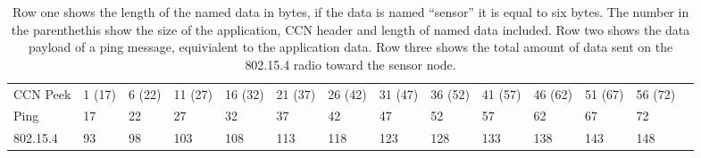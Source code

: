 





\begin{table}[]
\centering
\resizebox{\textwidth}{!}
{%
\begin{tabular}{|l|l|l|l|l|l|l|l|l|l|l|l|l|l}
\cline{1-13}
CCN Peek & 1 (17) & 6 (22) & 11 (27) & 16 (32) & 21 (37) & 26 (42) & 31 (47) & 36 (52) & 41 (57) & 46 (62) & 51 (67) & 56 (72) &  \\ \cline{1-13}
Ping     & 17     & 22     & 27      & 32      & 37      & 42      & 47      & 52      & 57      & 62      & 67      & 72      &  \\ \cline{1-13}
802.15.4 & 93     & 98     & 103     & 108     & 113     & 118     & 123     & 128     & 133     & 138     & 143     & 148     &  \\ \cline{1-13}
\end{tabular}
}
\caption{Row one shows the length of the named data in bytes, if the data is named ``sensor'' it is equal to six bytes. The number in the parenthethis show the size of the application, CCN header and length of named data included. Row two shows the data payload of a ping message, equivialent to the application data. Row three shows the total amount of data sent on the 802.15.4 radio toward the sensor node.}

\label{tab:packetSizes}
\end{table}




